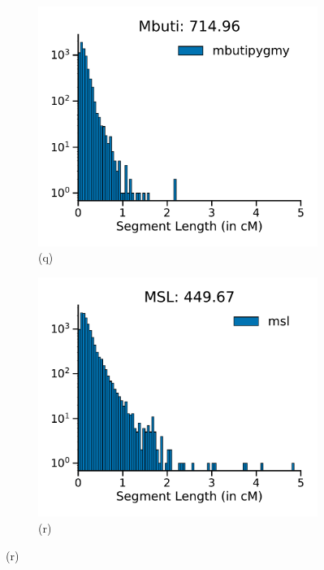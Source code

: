 \begin{figure}[htbp]
    \centering
    \begin{subfigure}[b]{0.4\textwidth}
        \includegraphics[width=\textwidth]{figures/gb_bta/segment_length/segment_lengths_histogram_mbutipygmy.pdf}
        \caption*{(q)}
    \end{subfigure}
    \hfill
    \begin{subfigure}[b]{0.4\textwidth}
        \includegraphics[width=\textwidth]{figures/gb_bta/segment_length/segment_lengths_histogram_msl.pdf}
        \caption*{(r)}
    \end{subfigure}


\end{figure}
